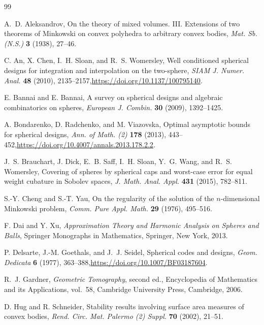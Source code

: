 \documentclass[11pt]{article}
\theoremstyle{definition}
\theoremstyle{remark}
\begin{document}
\begin{thebibliography}{99}

A.~D. Aleksandrov,
\newblock On the theory of mixed volumes. III. Extensions of two theorems of Minkowski on convex polyhedra to arbitrary convex bodies,
\newblock \emph{Mat. Sb. (N.S.)} \textbf{3} (1938), 27--46.

C. An, X. Chen, I.~H. Sloan, and R.~S. Womersley,
\newblock Well conditioned spherical designs for integration and interpolation on the two-sphere,
\newblock \emph{SIAM J. Numer. Anal.} \textbf{48} (2010), 2135--2157,\newblock \url{https://doi.org/10.1137/100795140}.

E. Bannai and E. Bannai,
\newblock A survey on spherical designs and algebraic combinatorics on spheres,
\newblock \emph{European J. Combin.} \textbf{30} (2009), 1392--1425.

A. Bondarenko, D. Radchenko, and M. Viazovska,
\newblock Optimal asymptotic bounds for spherical designs,
\newblock \emph{Ann. of Math. (2)} \textbf{178} (2013), 443--452,\newblock \url{https://doi.org/10.4007/annals.2013.178.2.2}.

J.~S. Brauchart, J. Dick, E.~B. Saff, I.~H. Sloan, Y.~G. Wang, and R.~S. Womersley,
\newblock Covering of spheres by spherical caps and worst-case error for equal weight cubature in Sobolev spaces,
\newblock \emph{J. Math. Anal. Appl.} \textbf{431} (2015), 782--811.

S.-Y. Cheng and S.-T. Yau,
\newblock On the regularity of the solution of the $n$-dimensional Minkowski problem,
\newblock \emph{Comm. Pure Appl. Math.} \textbf{29} (1976), 495--516.

F. Dai and Y. Xu,
\newblock \emph{Approximation Theory and Harmonic Analysis on Spheres and Balls},
\newblock Springer Monographs in Mathematics, Springer, New York, 2013.

P. Delsarte, J.-M. Goethals, and J.~J. Seidel,
\newblock Spherical codes and designs,
\newblock \emph{Geom. Dedicata} \textbf{6} (1977), 363--388,\newblock \url{https://doi.org/10.1007/BF03187604}.

R.~J. Gardner,
\newblock \emph{Geometric Tomography}, second ed.,
\newblock Encyclopedia of Mathematics and its Applications, vol.~58, Cambridge University Press, Cambridge, 2006.

D. Hug and R. Schneider,
\newblock Stability results involving surface area measures of convex bodies,
\newblock \emph{Rend. Circ. Mat. Palermo (2) Suppl.} \textbf{70} (2002), 21--51.


\end{thebibliography}
\end{document}
